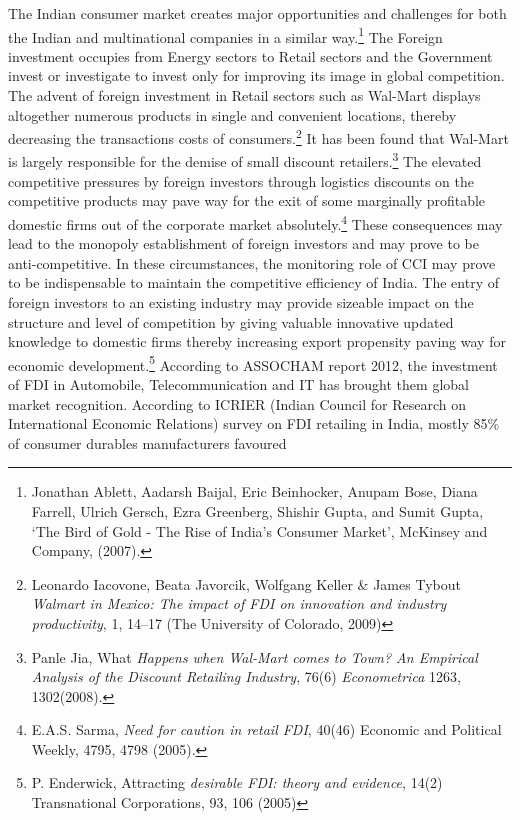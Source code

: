 \begin{multicols}{2}

\noi
The Indian consumer market creates major opportunities and challenges for both the Indian
and multinational companies in a similar way.\footnote{Jonathan Ablett, Aadarsh Baijal, Eric Beinhocker, Anupam Bose, Diana Farrell, Ulrich Gersch, Ezra
Greenberg, Shishir Gupta, and Sumit Gupta, ‘The Bird of Gold - The Rise of India's Consumer Market’,
McKinsey and Company, (2007).} The Foreign investment occupies from
Energy sectors to Retail sectors and the Government invest or investigate to invest only for
improving its image in global competition. The advent of foreign investment in Retail sectors
such as Wal-Mart displays altogether numerous products in single and convenient locations,
thereby decreasing the transactions costs of consumers.\footnote{Leonardo Iacovone, Beata Javorcik, Wolfgang Keller \& James Tybout \textit{Walmart in Mexico: The impact of
FDI on innovation and industry productivity}, 1, 14--17 (The University of Colorado, 2009)} It has been found that Wal-Mart is
largely responsible for the demise of small discount retailers.\footnote{Panle Jia, What \textit{Happens when Wal-Mart comes to Town? An Empirical Analysis of the Discount Retailing
Industry}, 76(6) \textit{Econometrica} 1263, 1302(2008).} The elevated competitive
pressures by foreign investors through logistics discounts on the competitive products may
pave way for the exit of some marginally profitable domestic firms out of the corporate
market absolutely.\footnote{E.A.S. Sarma, \textit{Need for caution in retail FDI}, 40(46) Economic and Political Weekly, 4795, 4798 (2005).} These consequences may lead to the monopoly establishment of foreign
investors and may prove to be anti-competitive. In these circumstances, the monitoring role
of CCI may prove to be indispensable to maintain the competitive efficiency of India.
The entry of foreign investors to an existing industry may provide sizeable impact on the
structure and level of competition by giving valuable innovative updated knowledge to
domestic firms thereby increasing export propensity paving way for economic
development.\footnote{P. Enderwick, Attracting \textit{desirable FDI: theory and evidence}, 14(2) Transnational Corporations, 93, 106 (2005)} According to ASSOCHAM report 2012, the investment of FDI in
Automobile, Telecommunication and IT has brought them global market recognition.
According to ICRIER (Indian Council for Research on International Economic Relations)
survey on FDI retailing in India, mostly 85\% of consumer durables manufacturers favoured

\end{multicols}
